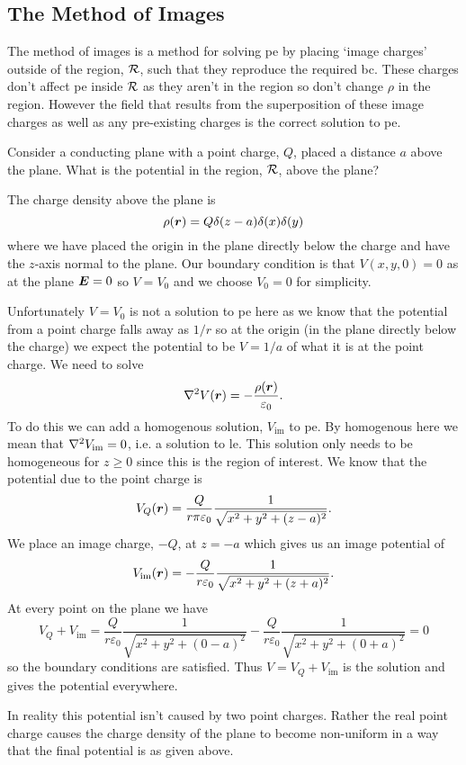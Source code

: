     \subsection{The Method of Images}
    The method of images is a method for solving \acrshort{pe} by placing `image charges' outside of the region, \(\mathcal{R}\), such that they reproduce the required \acrshort{bc}.
    These charges don't affect \acrshort{pe} inside \(\mathcal{R}\) as they aren't in the region so don't change \(\rho\) in the region.
    However the field that results from the superposition of these image charges as well as any pre-existing charges is the correct solution to \acrshort{pe}.
    
    \begin{example}
        Consider a conducting plane with a point charge, \(Q\), placed a distance \(a\) above the plane.
        What is the potential in the region, \(\mathcal{R}\), above the plane?
        
        The charge density above the plane is
        \[\rho(\bm{r}) = Q\delta(z - a)\delta(x)\delta(y)\]
        where we have placed the origin in the plane directly below the charge and have the \(z\)-axis normal to the plane.
        Our boundary condition is that \(V(x, y, 0) = 0\) as at the plane \(\bm{E} = 0\) so \(V = V_0\) and we choose \(V_0 = 0\) for simplicity.
        
        Unfortunately \(V = V_0\) is not a solution to \acrshort{pe} here as we know that the potential from a point charge falls away as \(1/r\) so at the origin (in the plane directly below the charge) we expect the potential to be \(V = 1/a\) of what it is at the point charge.
        We need to solve
        \[\nabla^2 V(\bm{r}) = -\frac{\rho(\bm{r})}{\varepsilon_0}.\]
        To do this we can add a homogenous solution, \(V_\text{im}\) to \acrshort{pe}.
        By homogenous here we mean that \(\nabla^2 V_\text{im} = 0\), i.e. a solution to \acrshort{le}.
        This solution only needs to be homogeneous for \(z \ge 0\) since this is the region of interest.
        We know that the potential due to the point charge is
        \[V_Q(\bm{r}) = \frac{Q}{r\pi\varepsilon_0}\frac{1}{\sqrt{x^2 + y^2 + (z - a)^2}}.\]
        We place an image charge, \(-Q\), at \(z = -a\) which gives us an image potential of
        \[V_\text{im}(\bm{r}) = -\frac{Q}{r\varepsilon_0}\frac{1}{\sqrt{x^2 + y^2 + (z + a)^2}}.\]
        At every point on the plane we have
        \[V_Q + V_\text{im} = \frac{Q}{r\varepsilon_0}\frac{1}{\sqrt{x^2 + y^2 + (0 - a)^2}} - \frac{Q}{r\varepsilon_0}\frac{1}{\sqrt{x^2 + y^2 + (0 + a)^2}} = 0\]
        so the boundary conditions are satisfied.
        Thus \(V = V_Q + V_\text{im}\) is the solution and gives the potential everywhere.
        
        In reality this potential isn't caused by two point charges.
        Rather the real point charge causes the charge density of the plane to become non-uniform in a way that the final potential is as given above.
    \end{example}
    
